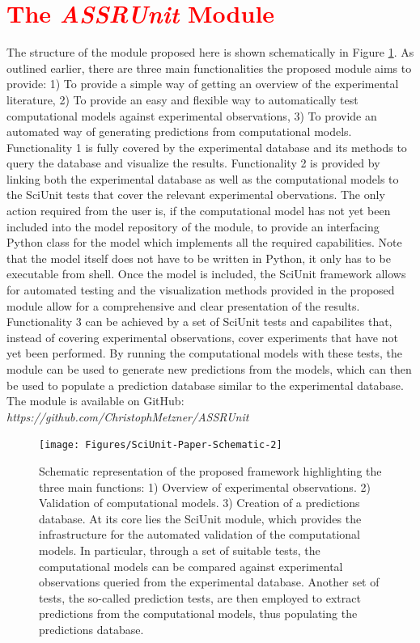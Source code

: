 \documentclass[a4paper,10pt]{article}
\begin{document}
\section{\textcolor{red}{The \textit{ASSRUnit} Module}}
The structure of the module proposed here is shown schematically in Figure \ref{Fig:Scheme}. As outlined earlier, there are three main functionalities the proposed module aims to provide: 1) To provide a simple way of getting an overview
of the experimental literature, 2) To provide an easy and flexible way to automatically test computational models against experimental observations, 3) To provide an automated way of generating predictions from computational
models. Functionality 1 is fully covered by the experimental database and its methods to query the database and visualize the results. Functionality 2 is provided by linking both the experimental database as well as the 
computational models to the SciUnit tests that cover the relevant experimental obervations. The only action required from the user is, if the computational model has not yet been included into the model repository of the module, 
to provide an interfacing Python class for the model which implements all the required capabilities. Note that the model itself does not have to be written in Python, it only has to be executable from shell. Once the model is
included, the SciUnit framework allows for automated testing and the visualization methods provided in the proposed module allow for a comprehensive and clear presentation of the results. Functionality 3 can be achieved by
a set of SciUnit tests and capabilites that, instead of covering experimental observations, cover experiments that have not yet been performed. By running the computational models with these tests, 
the module can be used to generate new predictions from the models, which can then be used to populate a prediction database similar to the experimental database. The module is available on GitHub: 
\textit{https://github.com/ChristophMetzner/ASSRUnit}


\begin{figure}
\texttt{[image: Figures/SciUnit-Paper-Schematic-2]}
\caption{Schematic representation of the proposed framework highlighting the three main functions: 1) Overview of experimental observations. 2) Validation of computational models. 3) Creation of a predictions database. At its core
lies the SciUnit module, which provides the infrastructure for the automated validation of the computational models. In particular, through a set of suitable tests, the computational models can be compared against experimental observations
queried from the experimental database. Another set of tests, the so-called prediction tests, are then employed to extract predictions from the computational models, thus populating the predictions database. }
\label{Fig:Scheme}
\end{figure}
\end{document}
